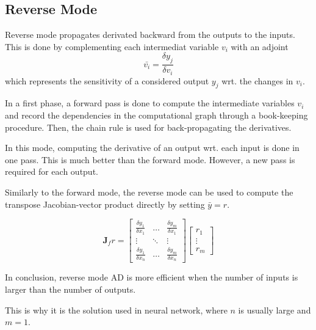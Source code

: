 \subsection{Reverse Mode}

Reverse mode propagates derivated backward from the outputs to the inputs. This is done by complementing each intermediat variable $v_i$ with an adjoint
\begin{equation}
    \bar{v_i} = \frac{\delta y_j}{\delta v_i}
\end{equation}
which represents the sensitivity of a considered output $y_j$ wrt. the changes in $v_i$.

In a first phase, a forward pass is done to compute the intermediate variables $v_i$ and record the dependencies in the computational graph through a book-keeping procedure.
Then, the chain rule is used for back-propagating the derivatives.


In this mode, computing the derivative of an output wrt. each input is done in one pass. This is much better than the forward mode. However, a new pass is required for each output.

Similarly to the forward mode, the reverse mode can be used to compute the transpose Jacobian-vector product directly by setting $\bar{y} = r$.

\begin{equation}
    \mathbf{J}_f r = \left[\begin{array}{ccc}
        \frac{\delta y_1}{\delta x_1} & \hdots & \frac{\delta y_m}{\delta x_1}  \\
        \vdots & \ddots & \vdots \\
        \frac{\delta y_1}{\delta x_n} & \hdots & \frac{\delta y_m}{\delta x_n}
    \end{array}\right]
    \left[\begin{array}{c}
        r_1 \\
        \vdots \\
        r_m
    \end{array}\right]
\end{equation}



In conclusion, reverse mode AD is more efficient when the number of inputs is larger than the number of outputs.

This is why it is the solution used in neural network, where $n$ is usually large and $m=1$.